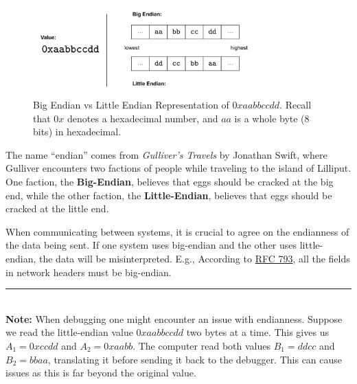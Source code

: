 \begin{figure}[ht!]
    \centering
    \includegraphics[width=0.8\textwidth]{sections/comp/big_endian.png}
    \caption{Big Endian vs Little Endian Representation of $0xaabbccdd$. Recall that $0x$ denotes a hexadecimal number,
    and $aa$ is a whole byte (8 bits) in hexadecimal.}
\end{figure}

\begin{Tip} The name ``endian'' comes from \emph{Gulliver's Travels} by Jonathan Swift, where
    Gulliver encounters two factions of people while traveling to the island of Lilliput. 
    One faction, the \textbf{Big-Endian}, believes that eggs should be cracked at the big end, 
    while the other faction, the \textbf{Little-Endian}, believes that eggs should be cracked at the little end.
\end{Tip}

    
\newpage

\begin{theo}

    \label{theo:communication_endianess}

    When communicating between systems, it is crucial to agree on the endianness of the data being sent. 
    If one system uses big-endian and the other uses little-endian, the data will be misinterpreted. 
    E.g., According to \href{https://datatracker.ietf.org/doc/html/rfc793}{RFC 793}, all the fields in network 
    headers must be big-endian.\\

    \noindent
    \rule{\textwidth}{0.4pt}\\
    \noindent
    \textbf{Note:} When debugging one might encounter an issue with endianness. Suppose we read the little-endian value
    $0xaabbccdd$ two bytes at a time. This gives us $A_1 = 0xccdd$ and $A_2 = 0xaabb$. The computer read both values 
    $B_1 = ddcc$ and $B_2 = bbaa$, translating it before sending it back to the debugger. This can cause issues as this is far beyond 
    the original value.
\end{theo}